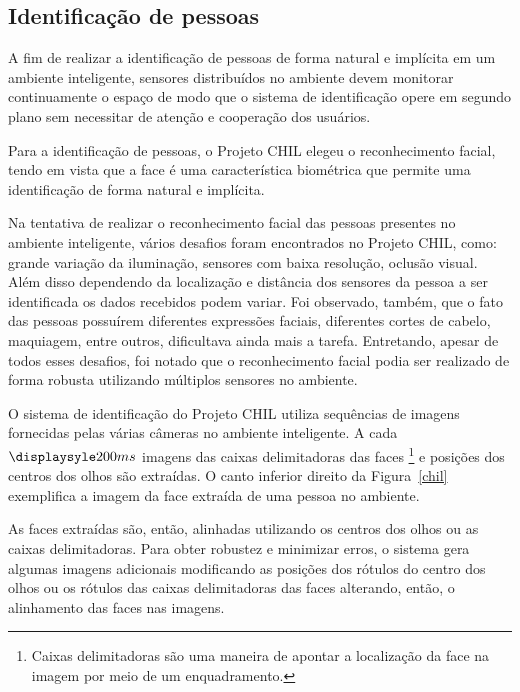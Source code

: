 \subsection{Identificação de pessoas}


A fim de realizar a identificação de pessoas de forma natural e implícita em um ambiente inteligente, sensores distribuídos no ambiente devem monitorar continuamente o espaço de modo que o sistema de identificação opere em segundo plano sem necessitar de atenção e cooperação dos usuários.

Para a identificação de pessoas, o Projeto CHIL elegeu o reconhecimento facial, tendo em vista que a face é uma característica biométrica que permite uma identificação de forma natural e implícita. 


Na tentativa de realizar o reconhecimento facial das pessoas presentes no ambiente inteligente, vários desafios foram encontrados no Projeto CHIL, como: grande variação da iluminação, sensores com baixa resolução, oclusão visual. Além disso dependendo da localização e distância dos sensores da pessoa a ser identificada os dados recebidos podem variar. Foi observado, também, que o fato das pessoas possuírem diferentes expressões faciais, diferentes cortes de cabelo, maquiagem, entre outros, dificultava ainda mais a tarefa. Entretando, apesar de todos esses desafios, foi notado que o reconhecimento facial podia ser realizado de forma robusta utilizando múltiplos sensores no ambiente.

O sistema de identificação do Projeto CHIL utiliza sequências de imagens fornecidas pelas várias câmeras no ambiente inteligente. A cada $\displaysyle 200ms$ imagens das caixas delimitadoras das faces \footnote{Caixas delimitadoras são uma maneira de apontar a localização da face na imagem por meio de um enquadramento.} e posições dos centros dos olhos são extraídas. O canto inferior direito da Figura~\ref{chil} exemplifica a imagem da face extraída de uma pessoa no ambiente.

As faces extraídas são, então, alinhadas utilizando os centros dos olhos ou as caixas delimitadoras. Para obter robustez e minimizar erros, o sistema gera algumas imagens adicionais modificando as posições dos rótulos do centro dos olhos ou os rótulos das caixas delimitadoras das faces alterando, então, o alinhamento das faces nas imagens.

